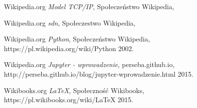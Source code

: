 \documentclass{article}
\begin{document}
  \begin{thebibliography}{9}

  Wikipedia.org
  \textit{Model TCP/IP},
  Społeczeństwo Wikipedia,
 
  Wikipedia.org
  \textit{ sdn},
  Społeczestwo Wikipedia,
  
  Wikipedia.org
  \textit{ Python},
  Społeczeństwo Wikipedia,
  https://pl.wikipedia.org/wiki/Python
  2002.

  Wikipedia.org
  \textit{Jupyter - wprowadzenie},
  perseba.github.io,
  http://perseba.github.io/blog/jupyter-wprowadzenie.html
  2015.

  Wikibooks.org
  \textit{LaTeX},
  Społeczność Wikibooks,
  https://pl.wikibooks.org/wiki/LaTeX
  2015.


  


\end{thebibliography}
\end{document}
